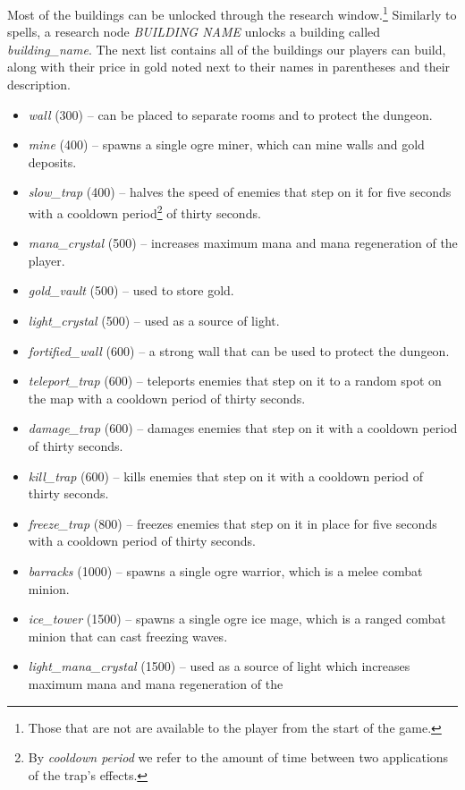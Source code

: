 Most of the buildings can be unlocked through the research window.\footnote{Those that are not are available to the player from the start of
the game.} Similarly to spells, a research node \emph{BUILDING NAME} unlocks a
building called \emph{building\_name}. The next list contains all of the buildings our players can build, along with their price
in gold noted next to their names in parentheses and their description.

\begin{itemize}
    \item \emph{wall} (300) -- can be placed to separate rooms and to protect the dungeon.
    \item \emph{mine} (400) -- spawns a single ogre miner, which can mine walls and gold deposits.
    \item \emph{slow\_trap} (400) -- halves the speed of enemies that step on it for five seconds with a cooldown
        period\footnote{By \emph{cooldown period} we refer to the amount of time between two applications of the trap's effects.}
        of thirty seconds.
    \item \emph{mana\_crystal} (500) -- increases maximum mana and mana regeneration of the player.
    \item \emph{gold\_vault} (500) -- used to store gold.
    \item \emph{light\_crystal} (500) -- used as a source of light.
    \item \emph{fortified\_wall} (600) -- a strong wall that can be used to protect the dungeon.
    \item \emph{teleport\_trap} (600) -- teleports enemies that step on it to a random spot on the map with a cooldown period
        of thirty seconds.
    \item \emph{damage\_trap} (600) -- damages enemies that step on it with a cooldown period of thirty seconds.
    \item \emph{kill\_trap} (600) -- kills enemies that step on it with a cooldown period of thirty seconds.
    \item \emph{freeze\_trap} (800) -- freezes enemies that step on it in place for five seconds with a cooldown period of thirty seconds.
    \item \emph{barracks} (1000) -- spawns a single ogre warrior, which is a melee combat minion.
    \item \emph{ice\_tower} (1500) -- spawns a single ogre ice mage, which is a ranged combat minion that can cast freezing waves.
    \item \emph{light\_mana\_crystal} (1500) -- used as a source of light which increases maximum mana and mana regeneration of the

\end{itemize}
